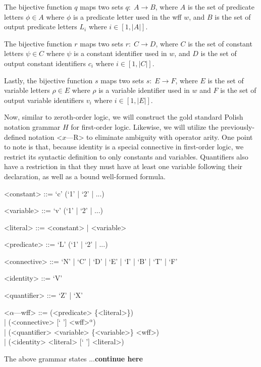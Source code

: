 \documentclass[ms]{uncgdissertationexp2}
\theoremstyle{plain}
\theoremstyle{definition}
\theoremstyle{remark}
\begin{document}
The bijective function $q$ maps two sets $q:\;A \to B$, where $A$ is the set of predicate letters $\phi \in A$ where $\phi$ is a predicate letter used in the wff $w$, and $B$ is the set of output predicate letters $L_{i}$ where $i \in [1, |A|]$.

The bijective function $r$ maps two sets $r:\;C \to D$, where $C$ is the set of constant letters $\psi \in C$ where $\psi$ is a constant identifier used in $w$, and $D$ is the set of output constant identifiers $c_{i}$ where $i \in [1, |C|]$.

Lastly, the bijective function $s$ maps two sets $s:\;E \to F$, where $E$ is the set of variable letters $\rho \in E$ where $\rho$ is a variable identifier used in $w$ and $F$ is the set of output variable identifiers $v_{i}$ where $i \in [1, |E|]$.

Now, similar to zeroth-order logic, we will construct the gold standard Polish notation grammar $H$ for first-order logic. Likewise, we will utilize the previously-defined notation \textless{$x$---R\textgreater} to eliminate ambiguity with operator arity. One point to note is that, because identity is a special connective in first-order logic, we restrict its syntactic definition to only constants and variables. Quantifiers also have a restriction in that they must have at least one variable following their declaration, as well as a bound well-formed formula.
\begin{grammar}

    <constant> ::= `c' (`1' | `2' | ...)

    <variable> ::= `v' (`1' | `2' | ...)

    <literal> ::= <constant> | <variable>

    <predicate> ::= `L' (`1' | `2' | ...)

    <connective> ::= `N' | `C' | `D' | `E' | `I' | `B' | `T' | `F'

    <identity> ::= `V'

    <quantifier> ::= `Z' | `X'

    <$\alpha$---wff> ::= (<predicate> \{<literal>\}) \\| (<connective> [` '] <wff>$^{\alpha}$) \\| (<quantifier> <variable> \{<variable>\} <wff>)\\| (<identity> <literal> [` '] <literal>)
\end{grammar}

The above grammar states ...\textbf{continue here}
\end{document}
